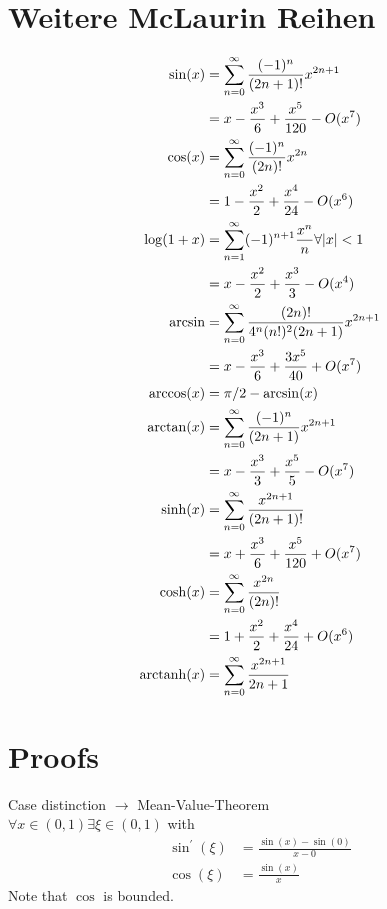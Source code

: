 \section{Weitere McLaurin Reihen}
\begin{align*}
\sin(x)     &= \sum_{n=0}^{\infty} \frac{(-1)^{n}}{(2 n+1) !} x^{2 n+1} \\
            &= x-\frac{x^{3}}{6}+\frac{x^{5}}{120} - O(x^7) \\
\cos(x)     &= \sum_{n=0}^{\infty} \frac{(-1)^{n}}{(2 n) !} x^{2 n} \\
            &= 1-\frac{x^{2}}{2}+\frac{x^{4}}{24} - O(x^6) \\
\log(1+x)   &= \sum_{n=1}^{\infty}(-1)^{n+1} \frac{x^{n}}{n} \forall |x|<1 \\
            &= x-\frac{x^{2}}{2}+\frac{x^{3}}{3} - O(x^4) \\
\arcsin     &= \sum_{n=0}^{\infty} \frac{(2 n) !}{4^{n}(n !)^{2}(2 n+1)} x^{2 n+1} \\
            &= x-\frac{x^{3}}{6}+\frac{3 x^{5}}{40} + O(x^7) \\
\arccos(x)  &= \pi/2-\arcsin(x) \\
\arctan(x)  &= \sum_{n=0}^{\infty} \frac{(-1)^{n}}{(2 n+1)} x^{2 n+1} \\
            &= x-\frac{x^{3}}{3}+\frac{x^{5}}{5} - O(x^7) \\
\sinh(x)    &= \sum_{n=0}^{\infty} \frac{x^{2 n+1}}{(2 n+1) !} \\
            &= x+\frac{x^{3}}{6}+\frac{x^{5}}{120} + O(x^7) \\
\cosh(x)    &= \sum_{n=0}^{\infty} \frac{x^{2 n}}{(2 n) !} \\
            &= 1+\frac{x^{2}}{2}+\frac{x^{4}}{24} + O(x^6) \\
\operatorname{arctanh}(x) &= \sum_{n=0}^{\infty} \frac{x^{2 n+1}}{2 n+1} 
\end{align*}


\section{Proofs}
\Beweis[$\sin(x) < x$] Case distinction $\rightarrow$ Mean-Value-Theorem \\
$\forall x \in (0,1) \exists \xi \in (0,1)$ with
\begin{align*}
\sin^{\prime}(\xi) &= \frac{\sin(x)-\sin(0)}{x-0} \\
\cos(\xi)		&= \frac{\sin(x)}{x}
\end{align*}
Note that $\cos$ is bounded. \\

